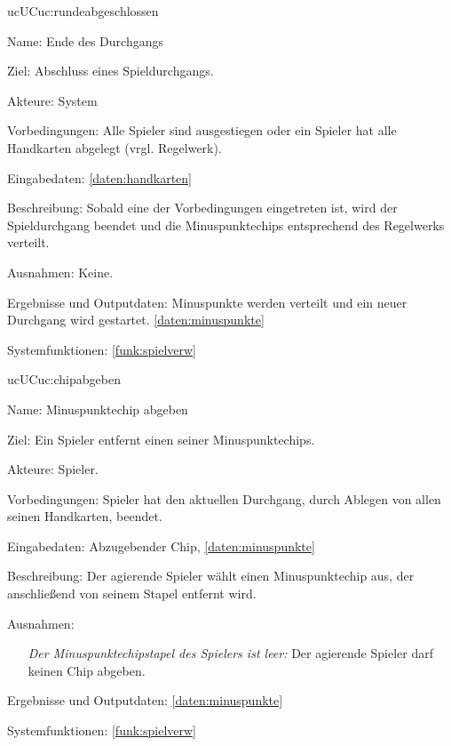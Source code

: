 \begin{description}[leftmargin=5em, style=sameline]
		\begin{lhp}{uc}{UC}{uc:rundeabgeschlossen}
		\item [Name:]Ende des Durchgangs
		\item [Ziel:]Abschluss eines Spieldurchgangs.
		\item [Akteure:]System
		\item [Vorbedingungen:]Alle Spieler sind ausgestiegen oder ein Spieler hat alle Handkarten abgelegt (vrgl. Regelwerk).
		\item [Eingabedaten:] \ref{daten:handkarten}
		\item [Beschreibung:] Sobald eine der Vorbedingungen eingetreten ist, wird der Spieldurchgang beendet und die Minuspunktechips entsprechend des Regelwerks verteilt.
		\item [Ausnahmen:]Keine.
		\item [Ergebnisse und Outputdaten:]Minuspunkte werden verteilt und ein neuer Durchgang wird gestartet. \ref{daten:minuspunkte}
		\item [Systemfunktionen:] \ref{funk:spielverw} 
	\end{lhp}
	
	\begin{lhp}{uc}{UC}{uc:chipabgeben}
		\item [Name:]Minuspunktechip abgeben
		\item [Ziel:]Ein Spieler entfernt einen seiner Minuspunktechips.
		\item [Akteure:]Spieler.
		\item [Vorbedingungen:]Spieler hat den aktuellen Durchgang, durch Ablegen von allen seinen Handkarten, beendet.
		\item [Eingabedaten:]Abzugebender Chip, \ref{daten:minuspunkte}
		\item [Beschreibung:]Der agierende Spieler wählt einen Minuspunktechip aus, der anschließend von seinem Stapel entfernt wird.
		\item [Ausnahmen:]\hfill
		\begin{itemize}
		    \item[]
		    \textit{Der Minuspunktechipstapel des Spielers ist leer: }Der agierende Spieler darf keinen Chip abgeben.
		\end{itemize}
		\item [Ergebnisse und Outputdaten:] \ref{daten:minuspunkte}
		\item [Systemfunktionen:] 
		\ref{funk:spielverw}
	\end{lhp}
	

\end{description}
